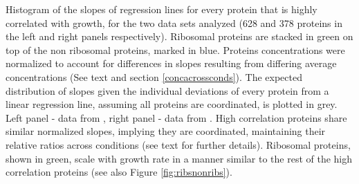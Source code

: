 \label{fig:globalfit}
    Histogram of the slopes of regression lines for every protein that is highly correlated with growth, for the two data sets analyzed (628 and 378 proteins in the left and right panels respectively).
    Ribosomal proteins are stacked in green on top of the non ribosomal proteins, marked in blue.
    Proteins concentrations were normalized to account for differences in slopes resulting from differing average concentrations (See text and section \ref{concacrossconds}).
    The expected distribution of slopes given the individual deviations of every protein from a linear regression line, assuming all proteins are coordinated, is plotted in grey.
    Left panel - data from \cite{Heinemann2015}, right panel - data from \cite{Valgepea2013}.
    High correlation proteins share similar normalized slopes, implying they are coordinated, maintaining their relative ratios across conditions (see text for further details).
    Ribosomal proteins, shown in green, scale with growth rate in a manner similar to the rest of the high correlation proteins (see also Figure \ref{fig:ribsnonribs}).
